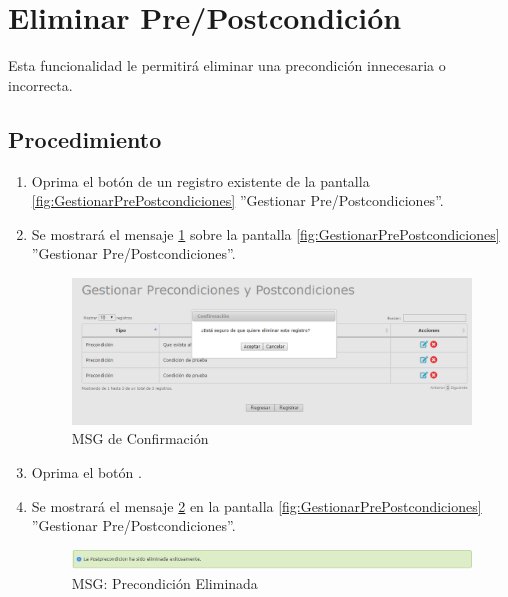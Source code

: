 \hypertarget{cv:eliminarCondicion}{\section{Eliminar Pre/Postcondición}} \label{sec:eliminarCondicion}

	Esta funcionalidad le permitirá eliminar una precondición innecesaria o incorrecta. 

		\subsection{Procedimiento}

			\begin{enumerate}
	
			\item Oprima el botón \IUBotonEliminar{} de un registro existente de la pantalla \ref{fig:GestionarPrePostcondiciones} ''Gestionar Pre/Postcondiciones''.
	
			\item Se mostrará el mensaje \ref{fig:confirmaEliminaPrePost} sobre la pantalla \ref{fig:GestionarPrePostcondiciones} ''Gestionar Pre/Postcondiciones''.
			
			\begin{figure}[htbp!]
				\begin{center}
					\includegraphics[scale=0.6]{roles/lider/casosUso/precondiciones/pantallas/IU6-1-2-3MSG10}
					\caption{MSG de Confirmación}
					\label{fig:confirmaEliminaPrePost}
				\end{center}
			\end{figure}
						
			\item Oprima el botón \IUAceptar.
			
			\item Se mostrará el mensaje \ref{fig:PrePostEliminada} en la pantalla \ref{fig:GestionarPrePostcondiciones} ''Gestionar Pre/Postcondiciones''.
			
			\begin{figure}[htbp!]
				\begin{center}
					\includegraphics[scale=0.6]{roles/lider/casosUso/precondiciones/pantallas/IU6-1-2-3MSG1}
					\caption{MSG: Precondición Eliminada}
					\label{fig:PrePostEliminada}
				\end{center}
			\end{figure}
			\end{enumerate}